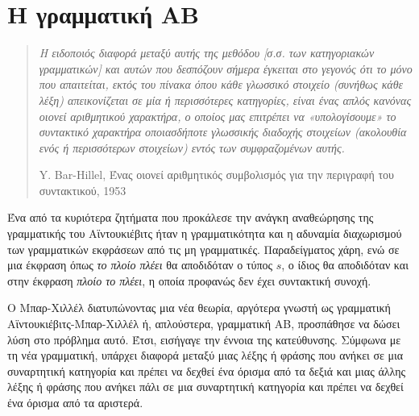 \documentclass [a4paper,11pt] {book}
\theoremstyle{definition}
\theoremstyle{definition}
\begin{document}
\section{Η γραμματική ΑΒ}
\label{sec:AB-Grammar}
\begin{quote}\itshape
Η ειδοποιός διαφορά μεταξύ αυτής της μεθόδου [σ.σ. των κατηγοριακών γραμματικών] και αυτών που δεσπόζουν σήμερα έγκειται στο γεγονός ότι το μόνο που απαιτείται, εκτός του πίνακα όπου κάθε γλωσσικό στοιχείο (συνήθως κάθε λέξη) απεικονίζεται σε μία ή περισσότερες κατηγορίες, είναι ένας απλός κανόνας οιονεί αριθμητικού χαρακτήρα, ο οποίος μας επιτρέπει να «υπολογίσουμε» το συντακτικό χαρακτήρα οποιασδήποτε γλωσσικής διαδοχής στοιχείων (ακολουθία ενός ή περισσότερων στοιχείων) εντός των συμφραζομένων αυτής.
\begin{flushright}
Y. Bar-Hillel, Ένας οιονεί αριθμητικός συμβολισμός για την περιγραφή του συντακτικού, 1953
\end{flushright}
\end{quote}
Ένα από τα κυριότερα ζητήματα που προκάλεσε την ανάγκη αναθεώρησης της γραμματικής του Αϊντουκιέβιτς ήταν η γραμματικότητα και η αδυναμία διαχωρισμού των γραμματικών εκφράσεων από τις μη γραμματικές. Παραδείγματος χάρη, ενώ σε μια έκφραση όπως \textit{το πλοίο πλέει} θα αποδιδόταν ο τύπος $s$, ο ίδιος θα αποδιδόταν και στην έκφραση \textit{πλοίο το πλέει}, η οποία προφανώς δεν έχει συντακτική συνοχή.

Ο Μπαρ-Χιλλέλ \citep{BarHillel53} διατυπώνοντας μια νέα θεωρία, αργότερα γνωστή ως γραμματική Αϊντουκιέβιτς-Μπαρ-Χιλλέλ ή, απλούστερα, γραμματική ΑΒ, προσπάθησε να δώσει λύση στο πρόβλημα αυτό. Έτσι, εισήγαγε την έννοια της κατεύθυνσης. Σύμφωνα με τη νέα γραμματική, υπάρχει διαφορά μεταξύ μιας λέξης ή φράσης που ανήκει σε μια συναρτητική κατηγορία και πρέπει να δεχθεί ένα όρισμα από τα δεξιά και μιας άλλης λέξης ή φράσης που ανήκει πάλι σε μια συναρτητική κατηγορία και πρέπει να δεχθεί ένα όρισμα από τα αριστερά.
\end{document}
